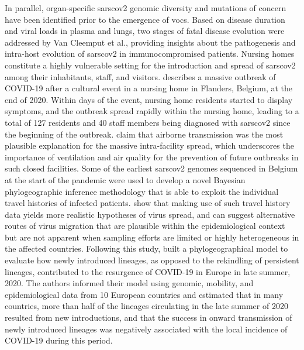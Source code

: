 In parallel, organ-specific \gls{sarscov2} genomic diversity and mutations of concern have been identified prior to the emergence of \gls{voc}s.
Based on disease duration and viral loads in plasma and lungs, two stages of fatal disease evolution were addressed by Van Cleemput et al., providing insights about the pathogenesis and intra-host evolution of \gls{sarscov2} in immunocompromised patients.
Nursing homes constitute a highly vulnerable setting for the introduction and spread of \gls{sarscov2} among their inhabitants, staff, and visitors.
\citet{vuylsteke2022role} describes a massive outbreak of COVID-19 after a cultural event in a nursing home in Flanders, Belgium, at the end of 2020.
Within days of the event, nursing home residents started to display symptoms, and the outbreak spread rapidly within the nursing home, leading to a total of 127 residents and 40 staff members being diagnosed with \gls{sarscov2} since the beginning of the outbreak.
\citet{vuylsteke2022role} claim that airborne transmission was the most plausible explanation for the massive intra-facility spread, which underscores the importance of ventilation and air quality for the prevention of future outbreaks in such closed facilities.
Some of the earliest \gls{sarscov2} genomes sequenced in Belgium at the start of the pandemic were used to develop a novel Bayesian phylogeographic inference methodology that is able to exploit the individual travel histories of infected patients.
\citet{lemey2020accommodating} show that making use of such travel history data yields more realistic hypotheses of virus spread, and can suggest alternative routes of virus migration that are plausible within the epidemiological context but are not apparent when sampling efforts are limited or highly heterogeneous in the affected countries.
Following this study, \citet{lemey2021untangling} built a phylogeographical model to evaluate how newly introduced lineages, as opposed to the rekindling of persistent lineages, contributed to the resurgence of COVID-19 in Europe in late summer, 2020.
The authors informed their model using genomic, mobility, and epidemiological data from 10 European countries and estimated that in many countries, more than half of the lineages circulating in the late summer of 2020 resulted from new introductions, and that the success in onward transmission of newly introduced lineages was negatively associated with the local incidence of COVID-19 during this period.



